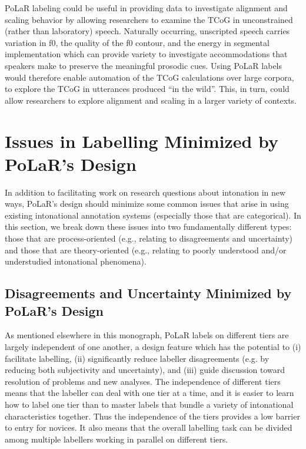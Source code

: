 \documentclass[11pt, twoside]{memoir}
\begin{document}
PoLaR labeling could be useful in providing data to investigate alignment and scaling behavior by allowing researchers to examine the TCoG in unconstrained (rather than laboratory) speech. Naturally occurring, unscripted speech carries variation in f0, the quality of the f0 contour, and the energy in segmental implementation which can provide variety to investigate accommodations that speakers make to preserve the meaningful prosodic cues.  Using PoLaR labels would therefore enable automation of the TCoG calculations over large corpora, to explore the TCoG in utterances produced “in the wild”. This, in turn, could allow researchers to explore alignment and scaling in a larger variety of contexts. 


\section{Issues in Labelling Minimized by PoLaR’s Design}\label{sec:logistical-issues-in-labelling}

In addition to facilitating work on research questions about intonation in new ways, PoLaR’s design should minimize some common issues that arise in using existing intonational annotation systems (especially those that are categorical). In this section, we break down these issues into two fundamentally different types: those that are process-oriented (e.g., relating to disagreements and uncertainty) and those that are theory-oriented (e.g., relating to poorly understood and/or understudied intonational phenomena).

\subsection{Disagreements and Uncertainty Minimized by PoLaR’s Design}\label{sec:reducing-inter-labeller-disagreement}

As mentioned elsewhere in this monograph, PoLaR labels on different tiers are largely independent of one another, a design feature which has the potential to (i) facilitate labelling, (ii) significantly reduce labeller disagreements (e.g.  by reducing both subjectivity and uncertainty), and (iii) guide discussion toward resolution of problems and new analyses. The independence of different tiers means that the labeller can deal with one tier at a time, and it is easier to learn how to label one tier than to master labels that bundle a variety of intonational characteristics together.  Thus the independence of the tiers provides a low barrier to entry for novices. It also means that the overall labelling task can be divided among multiple labellers working in parallel on different tiers.
\end{document}
